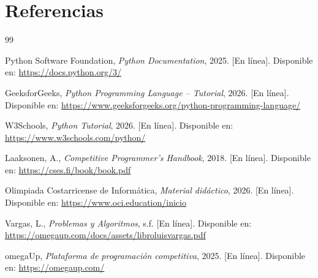 \section{Referencias}
\renewcommand{\refname}{}

\begin{thebibliography}{99}

\vspace{-1.25cm}

Python Software Foundation, \emph{Python Documentation}, 2025. [En línea]. Disponible en: \url{https://docs.python.org/3/}

GeeksforGeeks, \emph{Python Programming Language – Tutorial}, 2026. [En línea]. Disponible en: \url{https://www.geeksforgeeks.org/python-programming-language/}

W3Schools, \emph{Python Tutorial}, 2026. [En línea]. Disponible en: \url{https://www.w3schools.com/python/}

Laaksonen, A., \emph{Competitive Programmer’s Handbook}, 2018. [En línea]. Disponible en: \url{https://cses.fi/book/book.pdf}

Olimpiada Costarricense de Informática, \emph{Material didáctico}, 2026. [En línea]. Disponible en: \url{https://www.oci.education/inicio}

Vargas, L., \emph{Problemas y Algoritmos}, s.f. [En línea]. Disponible en: \url{https://omegaup.com/docs/assets/libroluisvargas.pdf}

omegaUp, \emph{Plataforma de programación competitiva}, 2025. [En línea]. Disponible en: \url{https://omegaup.com/}

\end{thebibliography}
